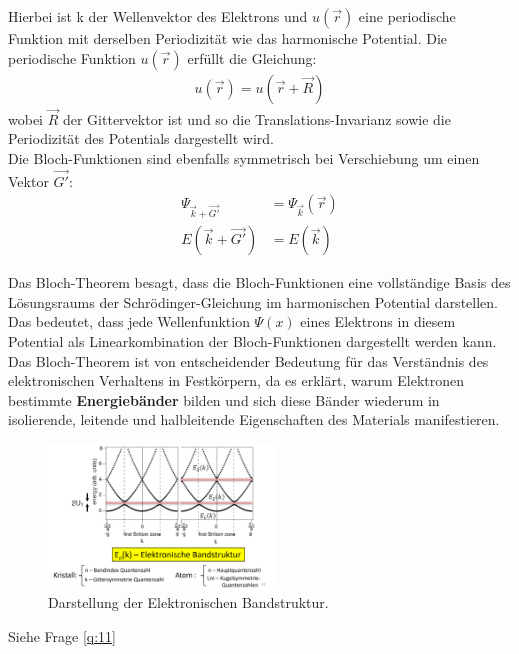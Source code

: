 Hierbei ist k der Wellenvektor des Elektrons und $u(\vec{r})$ eine periodische Funktion mit derselben Periodizität wie das harmonische Potential. Die periodische Funktion $u(\vec{r})$ erfüllt die Gleichung:
\begin{align}
    u(\vec{r}) = u(\vec{r}+\vec{R})
\end{align}
wobei $\vec{R} $ der Gittervektor ist und so die Translations-Invarianz sowie die Periodizität des Potentials dargestellt wird. \\

Die Bloch-Funktionen sind ebenfalls symmetrisch bei Verschiebung um einen Vektor $\vec{G'}$:
\begin{align}
    \Psi _{\vec{k} + \vec{G'}} &= \Psi _{\vec{k}} (\vec{r}) \\
    E(\vec{k} + \vec{G'}) &= E(\vec{k})
\end{align}

Das Bloch-Theorem besagt, dass die Bloch-Funktionen eine vollständige Basis des Lösungsraums der Schrödinger-Gleichung im harmonischen Potential darstellen. Das bedeutet, dass jede Wellenfunktion $\Psi(x)$ eines Elektrons in diesem Potential als Linearkombination der Bloch-Funktionen dargestellt werden kann. \\


Das Bloch-Theorem ist von entscheidender Bedeutung für das Verständnis des elektronischen Verhaltens in Festkörpern, da es erklärt, warum Elektronen bestimmte \textbf{Energiebänder} bilden und sich diese Bänder wiederum in isolierende, leitende und halbleitende Eigenschaften des Materials manifestieren.

\begin{figure}
    \centering
    \includegraphics[width=6cm]{resources/05-05-2015/frage8_blochtheorem.PNG}
    \caption{Darstellung der Elektronischen Bandstruktur.}
\end{figure}

\label{q:9}

\label{q:10}
Siehe Frage \ref{q:11}


\newpage
